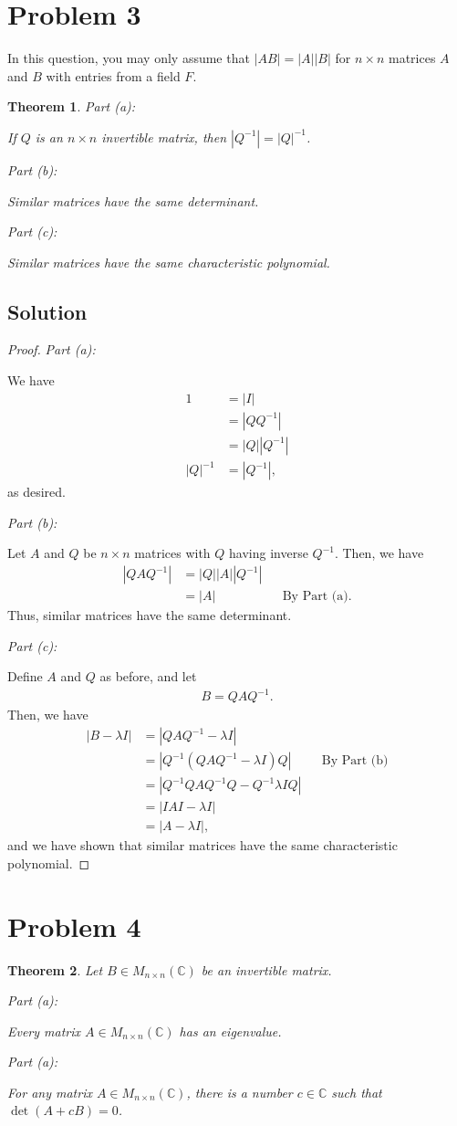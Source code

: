 \documentclass[10pt,a4paper]{article}
\makeatletter
\newtheorem{theorem}{Theorem}
\newcommand{\proofpart}[2]{%
  \par
  \addvspace{\medskipamount}%
  \noindent\emph{Part #1: #2}\par\nobreak
  \addvspace{\smallskipamount}%
  \@afterheading
}
\theoremstyle{definition}
\makeatother
\begin{document}
\section*{Problem 3}
In this question, you may only assume that $|AB| = |A||B|$ for $n \times n$ matrices $A$ and $B$ with entries from a field $F$.
\begin{theorem}
\proofpart{(a)}{} If $Q$ is an $n \times n$ invertible matrix, then $|Q^{-1}| = |Q|^{-1}$.
\proofpart{(b)}{} Similar matrices have the same determinant.
\proofpart{(c)}{} Similar matrices have the same characteristic polynomial.
\end{theorem}

\subsection*{Solution}
\begin{proof}
\proofpart{(a)}{} We have
\begin{align*}
1 &= |I| \\
&= |Q Q^{-1}|\\
&= |Q| |Q^{-1}|\\
|Q|^{-1} &= |Q^{-1}|,
\end{align*}
as desired.
\proofpart{(b)}{} Let $A$ and $Q$ be $n \times n$ matrices with $Q$ having inverse $Q^{-1}$. Then, we have
\begin{align*}
|Q A Q^{-1}| &= |Q| |A| |Q^{-1}|\\
&= |A| &&\text{By Part (a).}
\end{align*}
Thus, similar matrices have the same determinant.
\proofpart{(c)}{} Define $A$ and $Q$ as before, and let 
\begin{align*}
B = Q A Q^{-1}.
\end{align*}
Then, we have
\begin{align*}
|B - \lambda I| &= |Q A Q^{-1} - \lambda I|\\
&= |Q^{-1}(Q A Q^{-1} - \lambda I) Q| && \text{By Part (b)}\\
&= |Q^{-1}Q A Q^{-1}Q - Q^{-1}\lambda I Q| \\
&= |IAI - \lambda I|\\
&= |A - \lambda I|,
\end{align*}
and we have shown that similar matrices have the same characteristic polynomial.
\end{proof}

\section*{Problem 4}
\begin{theorem}
Let $B \in M_{n \times n} (\mathbb{C})$ be an invertible matrix.
\proofpart{(a)}{} Every matrix $A \in M_{n \times n} (\mathbb{C})$ has an eigenvalue. 
\proofpart{(a)}{} For any matrix $A \in M_{n \times n} (\mathbb{C})$, there is a number $c \in \mathbb{C}$ such that $\det(A + cB) = 0$. 
\end{theorem}
\end{document}
